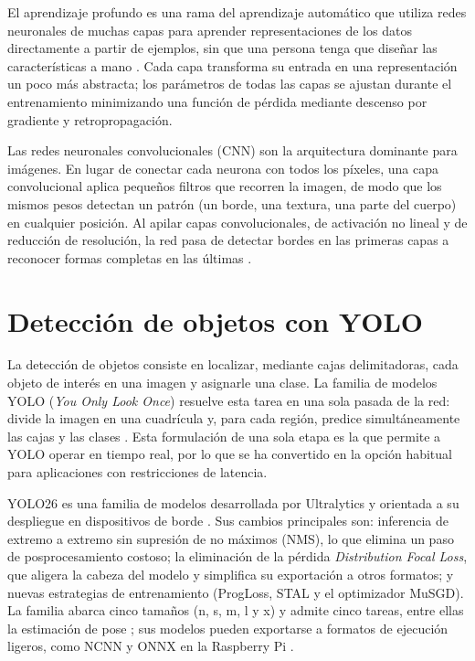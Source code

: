\documentclass[12pt,a4paper,oneside]{book}
\theoremstyle{plain}
\theoremstyle{definition}
\theoremstyle{remark}
\begin{document}
El aprendizaje profundo es una rama del aprendizaje automático que utiliza redes neuronales de muchas capas para aprender representaciones de los datos directamente a partir de ejemplos, sin que una persona tenga que diseñar las características a mano \parencite{lecun2015deep,goodfellow2016deep}. Cada capa transforma su entrada en una representación un poco más abstracta; los parámetros de todas las capas se ajustan durante el entrenamiento minimizando una función de pérdida mediante descenso por gradiente y retropropagación.

Las redes neuronales convolucionales (CNN) son la arquitectura dominante para imágenes. En lugar de conectar cada neurona con todos los píxeles, una capa convolucional aplica pequeños filtros que recorren la imagen, de modo que los mismos pesos detectan un patrón (un borde, una textura, una parte del cuerpo) en cualquier posición. Al apilar capas convolucionales, de activación no lineal y de reducción de resolución, la red pasa de detectar bordes en las primeras capas a reconocer formas completas en las últimas \parencite{lecun2015deep}.

\section{Detección de objetos con YOLO}
\label{sec:yolo}

La detección de objetos consiste en localizar, mediante cajas delimitadoras, cada objeto de interés en una imagen y asignarle una clase. La familia de modelos YOLO (\textit{You Only Look Once}) resuelve esta tarea en una sola pasada de la red: divide la imagen en una cuadrícula y, para cada región, predice simultáneamente las cajas y las clases \parencite{redmon2016yolo}. Esta formulación de una sola etapa es la que permite a YOLO operar en tiempo real, por lo que se ha convertido en la opción habitual para aplicaciones con restricciones de latencia.

YOLO26 es una familia de modelos desarrollada por Ultralytics y orientada a su despliegue en dispositivos de borde \parencite{ultralytics2026yolo26}. Sus cambios principales son: inferencia de extremo a extremo sin supresión de no máximos (NMS), lo que elimina un paso de posprocesamiento costoso; la eliminación de la pérdida \textit{Distribution Focal Loss}, que aligera la cabeza del modelo y simplifica su exportación a otros formatos; y nuevas estrategias de entrenamiento (ProgLoss, STAL y el optimizador MuSGD). La familia abarca cinco tamaños (n, s, m, l y x) y admite cinco tareas, entre ellas la estimación de pose \parencite{ultralytics2026yolo26}; sus modelos pueden exportarse a formatos de ejecución ligeros, como NCNN y ONNX en la Raspberry Pi \parencite{ultralytics2026rpi}.
\end{document}
